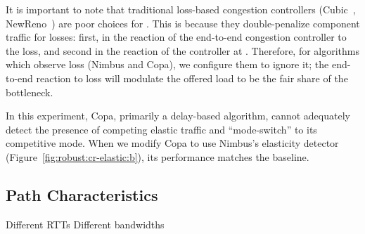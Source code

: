 It is important to note that traditional loss-based congestion controllers (\ie Cubic~\cite{cubic}, NewReno~\cite{reno}) are poor choices for \name. 
This is because they double-penalize component traffic for losses: first, in the reaction of the end-to-end congestion controller to the loss, and second in the reaction of the controller at \name.
Therefore, for algorithms which observe loss (Nimbus and Copa), we configure them to ignore it; the end-to-end reaction to loss will modulate the offered load to be the fair share of the bottleneck.

In this experiment, Copa, primarily a delay-based algorithm, cannot adequately detect the presence of competing elastic traffic and ``mode-switch'' to its competitive mode. When we modify Copa to use Nimbus's elasticity detector (Figure~\ref{fig:robust:cr-elastic:b}), its performance matches the baseline.

\subsection{Path Characteristics}\label{s:robust:path}
\begin{outline}
\1 Different RTTs
\1 Different bandwidths
\end{outline}
